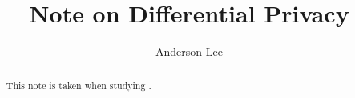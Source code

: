 \documentclass[a4paper]{report}
\author{Anderson Lee}
\title{Note on Differential Privacy}
\begin{document}
\maketitle

\begin{abstract}
	This note is taken when studying \cite{cynthia2014algorithmic}.
\end{abstract}

\newpage

\tableofcontents


\newpage
\appendix
\appendixpage{}



\newpage
\pagestyle{plain}
\printbibliography{}
\end{document}
